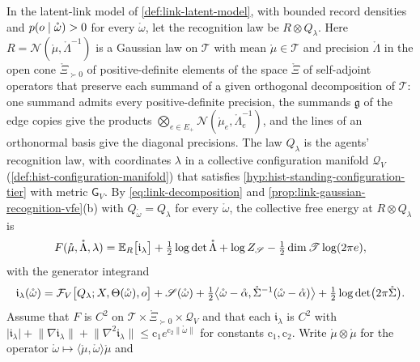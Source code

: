 In the latent-link model of \cref{def:link-latent-model}, with bounded record densities and
$p(o\mid\mathring\omega)>0$ for every $\mathring\omega$, let the recognition law be
$R\otimes Q_\lambda$. Here $R=\mathcal N(\mathring\mu,\mathring\Lambda^{-1})$ is a Gaussian law on
$\mathscr T$ with mean $\mathring\mu\in\mathscr T$ and precision $\mathring\Lambda$ in the open cone
$\mathring\Xi_{\succ0}$ of positive-definite elements of the space $\mathring\Xi$ of self-adjoint
operators that preserve each summand of a given orthogonal decomposition of $\mathscr T$: one summand
admits every positive-definite precision, the summands $\mathfrak g$ of the edge copies give the
products $\bigotimes_{e\in E_+}\mathcal N(\mathring\mu_e,\mathring\Lambda_e^{-1})$, and the lines of an
orthonormal basis give the diagonal precisions. The law $Q_\lambda$ is the agents' recognition law,
with coordinates $\lambda$ in a collective configuration manifold $\mathcal Q_V$
(\cref{def:hist-configuration-manifold}) that satisfies \cref{hyp:hist-standing-configuration-tier}
with metric $\mathsf G_V$. By \eqref{eq:link-decomposition} and
\cref{prop:link-gaussian-recognition-vfe}(b) with $Q_{\mathring\omega}=Q_\lambda$ for every
$\mathring\omega$, the collective free energy at $R\otimes Q_\lambda$ is
\begin{equation}
F(\mathring\mu,\mathring\Lambda,\lambda)
=\mathbb E_R\bigl[\mathfrak i_\lambda\bigr]+\tfrac12\log\det\mathring\Lambda+\log Z_{\mathscr S}
-\tfrac12\dim\mathscr T\log(2\pi e),
\label{eq:link-gaussian-free-energy}
\end{equation}
with the generator integrand
\begin{equation}
\mathfrak i_\lambda(\mathring\omega)
=\mathcal F_V\bigl[Q_\lambda;X,\Theta(\mathring\omega),o\bigr]+\mathscr S(\mathring\omega)
+\tfrac12\bigl\langle\mathring\omega-\mathring\alpha,\mathring\Sigma^{-1}(\mathring\omega-\mathring\alpha)\bigr\rangle
+\tfrac12\log\det\bigl(2\pi\mathring\Sigma\bigr).
\label{eq:link-generator-integrand}
\end{equation}
Assume that $F$ is $C^2$ on $\mathscr T\times\mathring\Xi_{\succ0}\times\mathcal Q_V$ and that each
$\mathfrak i_\lambda$ is $C^2$ with
$\lvert\mathfrak i_\lambda\rvert+\lVert\nabla\mathfrak i_\lambda\rVert+\lVert\nabla^2\mathfrak i_\lambda\rVert\leq\mathrm c_1e^{\mathrm c_2\lVert\mathring\omega\rVert}$
for constants $\mathrm c_1,\mathrm c_2$. Write $\mathring\mu\otimes\mathring\mu$ for the operator
$\mathring\omega\mapsto\langle\mathring\mu,\mathring\omega\rangle\mathring\mu$ and
